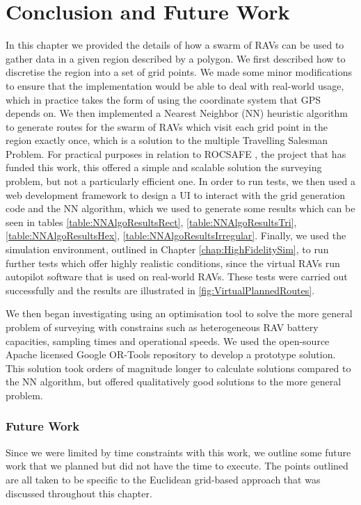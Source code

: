 \section{Conclusion and Future Work}\label{sec:SurveyingConclusionFutureWork}
In this chapter we provided the details of how a swarm of RAVs can be used to gather data in a given region described by a polygon. We first described how to discretise the region into a set of grid points. We made some minor modifications to ensure that the implementation would be able to deal with real-world usage, which in practice takes the form of using the coordinate system that GPS depends on. We then implemented a Nearest Neighbor (NN) heuristic algorithm to generate routes for the swarm of RAVs which visit each grid point in the region exactly once, which is a solution to the multiple Travelling Salesman Problem. For practical purposes in relation to ROCSAFE \cite{Bagherzadeh2017ROCSAFE:Incidents}, the project that has funded this work, this offered a simple and scalable solution the surveying problem, but not a particularly efficient one. In order to run tests, we then used a web development framework to design a UI to interact with the grid generation code and the NN algorithm, which we used to generate some results which can be seen in tables \ref{table:NNAlgoResultsRect}, \ref{table:NNAlgoResultsTri}, \ref{table:NNAlgoResultsHex}, \ref{table:NNAlgoResultsIrregular}. Finally, we used the simulation environment, outlined in Chapter \ref{chap:HighFidelitySim}, to run further tests which offer highly realistic conditions, since the virtual RAVs run autopilot software that is used on real-world RAVs. These tests were carried out successfully and the results are illustrated in \ref{fig:VirtualPlannedRoutes}. 

We then began investigating using an optimisation tool to solve the more general problem of surveying with constrains such as heterogeneous RAV battery capacities, sampling times and operational speeds. We used the open-source Apache licensed Google OR-Tools repository to develop a prototype solution. This solution took orders of magnitude longer to calculate solutions compared to the NN algorithm, but offered qualitatively good solutions to the more general problem.



\subsubsection{Future Work}
Since we were limited by time constraints with this work, we outline some future work that we planned but did not have the time to execute. The points outlined are all taken to be specific to the Euclidean grid-based approach that was discussed throughout this chapter.

